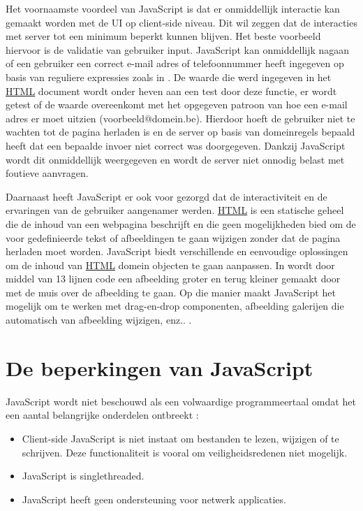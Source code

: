 	Het voornaamste voordeel van JavaScript is dat er onmiddellijk interactie kan gemaakt worden met de UI op client-side niveau. Dit wil zeggen dat de interacties met server tot een minimum beperkt kunnen blijven. Het beste voorbeeld hiervoor is de validatie van gebruiker input. JavaScript kan onmiddellijk nagaan of een gebruiker een correct e-mail adres of telefoonnummer heeft ingegeven op basis van reguliere expressies zoals in . De waarde die werd ingegeven in het \hyperref[html]{HTML} document wordt onder heven aan een test door deze functie, er wordt getest of de waarde overeenkomt met het opgegeven patroon van hoe een e-mail adres er moet uitzien (voorbeeld@domein.be). Hierdoor hoeft de gebruiker niet te wachten tot de pagina herladen is en de server op basis van domeinregels bepaald heeft dat een bepaalde invoer niet correct was doorgegeven. Dankzij JavaScript wordt dit onmiddellijk weergegeven en wordt de server niet onnodig belast met foutieve aanvragen.

	Daarnaast heeft JavaScript er ook voor gezorgd dat de interactiviteit en de ervaringen van de gebruiker aangenamer werden. \hyperref[html]{HTML} is een statische geheel die de inhoud van een webpagina beschrijft en die geen mogelijkheden bied om de voor gedefinieerde tekst of afbeeldingen te gaan wijzigen zonder dat de pagina herladen moet worden. JavaScript biedt verschillende en eenvoudige oplossingen om de inhoud van \hyperref[html]{HTML} domein objecten te gaan aanpassen. \citep{vijaywebsolutions:Javascript}
	In  wordt door middel van 13 lijnen code een afbeelding groter en terug kleiner gemaakt door met de muis over de afbeelding te gaan. Op die manier maakt JavaScript het mogelijk om te werken met drag-en-drop componenten, afbeelding galerijen die automatisch van afbeelding wijzigen, enz.. .

\section{De beperkingen van JavaScript}
JavaScript wordt niet beschouwd als een volwaardige programmeertaal omdat het een aantal belangrijke onderdelen ontbreekt : 
	\begin{itemize}
		\item Client-side JavaScript is niet instaat om bestanden te lezen, wijzigen of te schrijven. Deze functionaliteit is vooral om veiligheidsredenen niet mogelijk.
		\item JavaScript is singlethreaded.
		\item JavaScript heeft geen ondersteuning voor netwerk applicaties.
	\end{itemize} 
